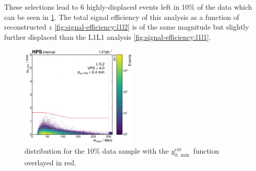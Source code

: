 These selections lead to 6 highly-displaced events left in 10\% of the data
which can be seen in \cref{fig:y0-cut-on-data}.
The total signal efficiency of this analysis as a function of reconstructed $z$
\cref{fig:signal-efficiency:l1l2} is of the same magnitude but slightly further displaced
than the L1L1 analysis \cref{fig:signal-efficiency:l1l1}.

\begin{figure}
  \centering
  \includegraphics[width=0.5\textwidth]{figures/hps/analysis/y0-cut-on-data-10pct.pdf}
  \caption{\minyzero distribution for the 10\% data sample with the
  $y_{0,\min}^\mathrm{cut}$ function overlayed in red.}
  \label{fig:y0-cut-on-data}
\end{figure}

